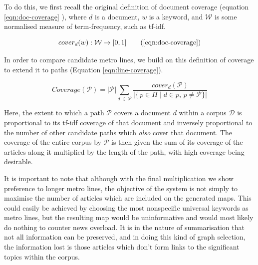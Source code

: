 To do this, we first recall the original definition of document coverage (equation \ref{eqn:doc-coverage} \citep{GeneratingInformationMaps, MetroMapsOfScience, InformationCartographyPre}), where $d$ is a document, $w$ is a keyword, and $\mathcal{W}$ is some normalised measure of term-frequency, such as tf-idf.

\begin{equation}
	cover_{d}(w) : \mathcal{W} \rightarrow [0,1]
	\tag{\ref{eqn:doc-coverage}}
\end{equation}

In order to compare candidate metro lines, we build on this definition of coverage to extend it to paths (Equation \ref{eqn:line-coverage}).

\begin{equation}
	Coverage(\mathcal{P}) = {|\mathcal{P}|}\sum_{d\,\in\,\mathcal{P}}\frac{cover_{d}(\mathcal{P})}{|\{\,p\in{\Pi}\;|\;d \in p,\,p \neq \mathcal{P}\}|}
	\label{eqn:line-coverage}
\end{equation}

Here, the extent to which a path $\mathcal{P}$ covers a document $d$ within a corpus $\mathcal{D}$ is proportional to its tf-idf coverage of that document and inversely proportional to the number of other candidate paths which \textit{also} cover that document. The coverage of the entire corpus by $\mathcal{P}$ is then given the sum of its coverage of the articles along it multiplied by the length of the path, with high coverage being desirable.

It is important to note that although with the final multiplication we show preference to longer metro lines, the objective of the system is not simply to maximise the number of articles which are included on the generated maps. This could easily be achieved by choosing the most nonspecific universal keywords as metro lines, but the resulting map would be uninformative and would most likely do nothing to counter news overload. It is in the nature of summarisation that not all information can be preserved, and in doing this kind of graph selection, the information lost is those articles which don't form links to the significant topics within the corpus.


